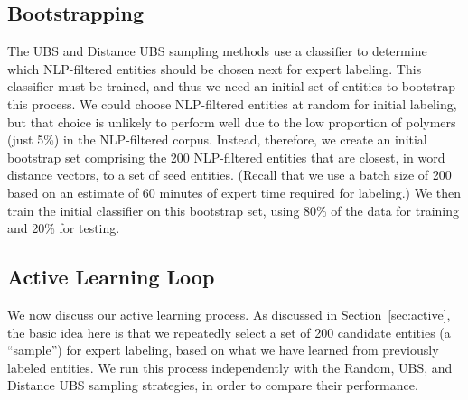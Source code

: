 \subsection{Bootstrapping}\label{sec:bootstrap}
The UBS and Distance UBS sampling methods use a classifier to 
determine which NLP-filtered entities should be chosen next for expert labeling.
This classifier must be trained, and thus we need an initial set of entities to bootstrap this process.
We could choose NLP-filtered entities at random for initial labeling, 
but that choice is unlikely to perform well due to the low proportion of polymers (just 5\%) in the NLP-filtered corpus.
Instead, therefore, we create an initial bootstrap set comprising the 200 NLP-filtered entities 
that are closest, in word distance vectors, to a set of seed entities.
(Recall that we use a batch size of 200 based on an estimate of 60 minutes of expert time required for labeling.)
We then train the initial classifier on this bootstrap set, using 80\% of the data for training and 20\% for testing.

\subsection{Active Learning Loop}
We now discuss our active learning process. 
As discussed in Section~\ref{sec:active}, the basic idea here is that we repeatedly select a set of 200
candidate entities (a ``sample'') for expert labeling, 
based on what we have learned from previously labeled entities.
We run this process independently with the Random, UBS, and Distance UBS sampling strategies,
in order to compare their performance.

